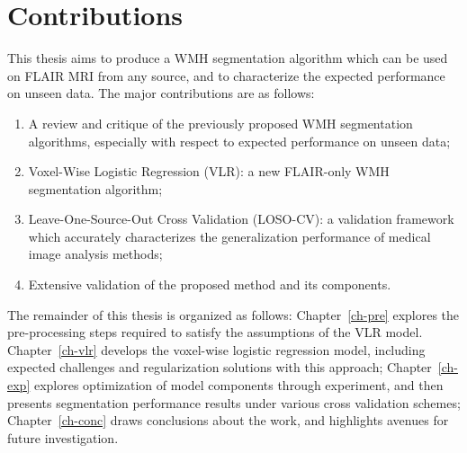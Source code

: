 \section{Contributions}
This thesis aims to produce a WMH segmentation algorithm
which can be used on FLAIR MRI from any source,
and to characterize the expected performance on unseen data.
The major contributions are as follows:
\begin{enumerate}
  \item A review and critique of the previously proposed WMH segmentation algorithms,
  especially with respect to expected performance on unseen data;
  \item Voxel-Wise Logistic Regression (VLR): a new FLAIR-only WMH segmentation algorithm;
  \item Leave-One-Source-Out Cross Validation (LOSO-CV): a validation framework
  which accurately characterizes the generalization performance of medical image analysis methods;
  \item Extensive validation of the proposed method and its components.
\end{enumerate}
The remainder of this thesis is organized as follows:
Chapter~\ref{ch-pre} explores the pre-processing steps
required to satisfy the assumptions of the VLR model.
Chapter~\ref{ch-vlr} develops the voxel-wise logistic regression model,
including expected challenges and regularization solutions with this approach;
Chapter~\ref{ch-exp} explores optimization of model components through experiment,
and then presents segmentation performance results under various cross validation schemes;
Chapter~\ref{ch-conc} draws conclusions about the work,
and highlights avenues for future investigation.
